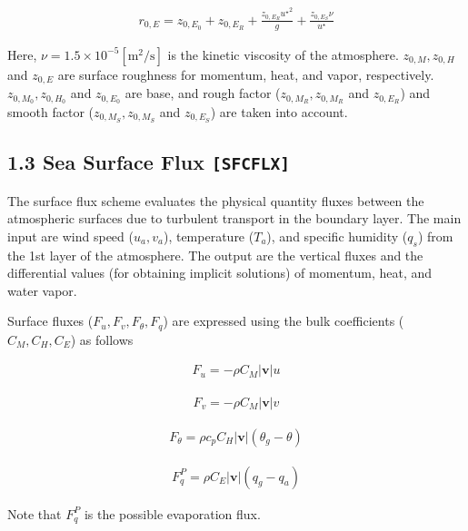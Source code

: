 \begin{eqnarray}
    r_{0,E} = z_{0,E_0} + z_{0,E_R} + \frac{z_{0,E_R} {u^\star }^2 }{g} + \frac{z_{0,E_S}\nu }{u^\star}
\end{eqnarray}

Here, \(\nu = 1.5 \times 10^{-5} \mathrm{[m^2/s]}\) is the kinetic
viscosity of the atmosphere. \(z_{0,M},z_{0,H}\) and \(z_{0,E}\) are
surface roughness for momentum, heat, and vapor, respectively.
\(z_{0,M_0},z_{0,H_0}\) and \(z_{0,E_0}\) are base, and rough factor
(\(z_{0,M_R},z_{0,M_R}\) and \(z_{0,E_R}\)) and smooth factor
(\(z_{0,M_S},z_{0,M_S}\) and \(z_{0,E_S}\)) are taken into account.

\hypertarget{sea-surface-flux-sfcflx}{%
\subsection{\texorpdfstring{1.3 Sea Surface Flux
\texttt{{[}SFCFLX{]}}}{1.3 Sea Surface Flux {[}SFCFLX{]}}}\label{sea-surface-flux-sfcflx}}

The surface flux scheme evaluates the physical quantity fluxes between
the atmospheric surfaces due to turbulent transport in the boundary
layer. The main input are wind speed (\(u_a, v_a\)), temperature
(\(T_a\)), and specific humidity (\(q_s\)) from the 1st layer of the
atmosphere. The output are the vertical fluxes and the differential
values (for obtaining implicit solutions) of momentum, heat, and water
vapor.

Surface fluxes (\(F_u, F_v, F_\theta, F_q\)) are expressed using the
bulk coefficients (\(C_M, C_H, C_E\)) as follows

\begin{eqnarray}
    F_u  =  - \rho C_M |{\mathbf{v}}| u
\end{eqnarray}

\begin{eqnarray}
    F_v  =  - \rho C_M |{\mathbf{v}}| v
\end{eqnarray}

\begin{eqnarray}
    F_\theta  = \rho c_p C_H |{\mathbf{v}}| ( \theta_g - \theta )
\end{eqnarray}

\begin{eqnarray}
    F_q^P =  \rho C_E |{\mathbf{v}}| ( q_g - q_a )
\end{eqnarray}

Note that \(F_q^P\) is the possible evaporation flux.


